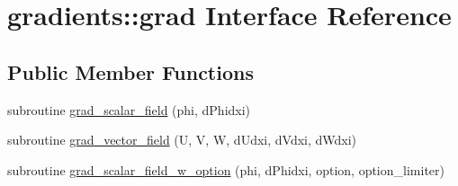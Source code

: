 \hypertarget{interfacegradients_1_1grad}{\section{gradients\-:\-:grad Interface Reference}
\label{interfacegradients_1_1grad}
}
\subsection*{Public Member Functions}
\begin{DoxyCompactItemize}
\item 
subroutine \hyperlink{interfacegradients_1_1grad_a5cf477680ba1663dd2a19fca4667393d}{grad\-\_\-scalar\-\_\-field} (phi, d\-Phidxi)
\item 
subroutine \hyperlink{interfacegradients_1_1grad_a10bfb0c5c2ca801765cb5cf1826ab634}{grad\-\_\-vector\-\_\-field} (U, V, W, d\-Udxi, d\-Vdxi, d\-Wdxi)
\item 
subroutine \hyperlink{interfacegradients_1_1grad_ad9be9824ec8b3b537c0b501967f241a8}{grad\-\_\-scalar\-\_\-field\-\_\-w\-\_\-option} (phi, d\-Phidxi, option, option\-\_\-limiter)
\end{DoxyCompactItemize}


